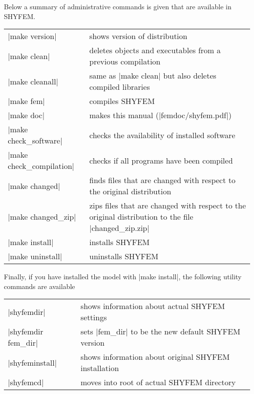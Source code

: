 
Below a summary of administrative commands is given that are
available in SHYFEM. \vspace{0.5cm}

\begin{center}
\begin{tabular}{ l p{7cm} }
|make version|		&	shows version of distribution \\
|make clean|		&	deletes objects and executables from a previous
                        	compilation \\
|make cleanall|		&	same as |make clean| but also deletes 
				compiled libraries \\
|make fem|		&	compiles SHYFEM \\
|make doc|		&	makes this manual (|femdoc/shyfem.pdf|) \\
|make check_software|	&	checks the availability of installed software \\
|make check_compilation|&	checks if all programs have been compiled \\
|make changed|		&	finds files that are changed with respect to the
				original distribution \\
|make changed_zip|	&	zips files that are changed with respect to the
				original distribution to the file 
				|changed_zip.zip| \\
|make install|		&	installs SHYFEM \\
|make uninstall|	&	uninstalls SHYFEM \\
\end{tabular}
\end{center}

\vspace{0.5cm}
Finally, if you have installed the model with |make install|, 
the following utility commands are available \vspace{0.5cm}

\begin{center}
\begin{tabular}{ l l }
|shyfemdir|		&	shows information about actual SHYFEM
				settings \\
|shyfemdir fem_dir|	&	sets |fem_dir| to be the new default 
				SHYFEM version \\
|shyfeminstall|		&	shows information about original SHYFEM 
				installation \\
|shyfemcd|		&	moves into root of actual SHYFEM directory \\
\end{tabular}
\end{center}

